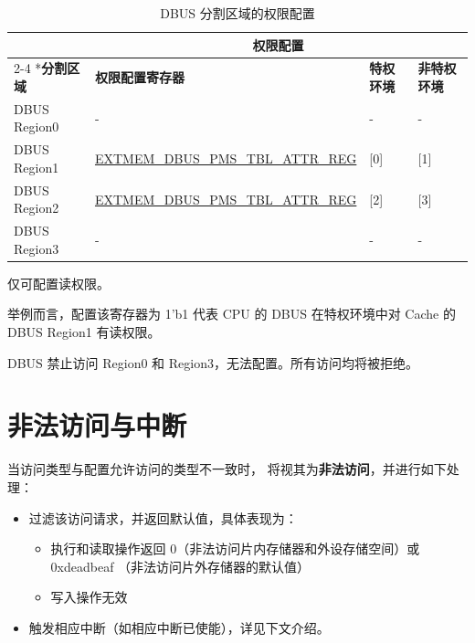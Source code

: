 \documentclass[main\_\_CN.tex]{subfiles}
\begin{document}
\begin{table}[H]
    \centering
    \caption{DBUS 分割区域的权限配置}
    \label{tab:dbus_acs_cache_pms}
    \begin{threeparttable}
    \begin{tabular}{ | l | l | l | l |}
    \hline
        \rowcolor{lightgray}
         & \multicolumn{3}{c|}{\textbf{权限配置}} \\\cline{2-4}
        \rowcolor{lightgray}
        \multirow{-2}*{\textbf{分割区域}} & \textbf{权限配置寄存器} & \textbf{特权环境}\tnote{A} & \textbf{非特权环境}\tnote{A}\\\hline
        DBUS Region0\tnote{C}  & - & - & -\\\hline
        DBUS Region1  & \hyperref[regdesc:EXTMEMDBUSPMSTBLATTRREG]{EXTMEM\_DBUS\_PMS\_TBL\_ATTR\_REG} & [0] \tnote{B}& [1]\\\hline
        DBUS Region2  & \hyperref[regdesc:EXTMEMDBUSPMSTBLATTRREG]{EXTMEM\_DBUS\_PMS\_TBL\_ATTR\_REG} & [2] & [3]\\\hline
        DBUS Region3\tnote{C}  & - & - & -\\\hline
    \end{tabular}
    \begin{tablenotes}
        \item[A] 仅可配置读权限。
        \item[B] 举例而言，配置该寄存器为 1'b1 代表 CPU 的 DBUS 在特权环境中对 Cache 的 DBUS Region1 有读权限。
        \item[C] DBUS 禁止访问 Region0 和 Region3，无法配置。所有访问均将被拒绝。
        \end{tablenotes}
    \end{threeparttable}
\end{table}

\section{非法访问与中断}

当访问类型与配置允许访问的类型不一致时，\chipname{} 将视其为\textbf{非法访问}，并进行如下处理：

\begin{itemize}
    \item 过滤该访问请求，并返回默认值，具体表现为：
    \begin{itemize}
        \item 执行和读取操作返回 0（非法访问片内存储器和外设存储空间）或 0xdeadbeaf （非法访问片外存储器的默认值）
        \item 写入操作无效
    \end{itemize}
    \item 触发相应中断（如相应中断已使能），详见下文介绍。
\end{itemize}
\end{document}
